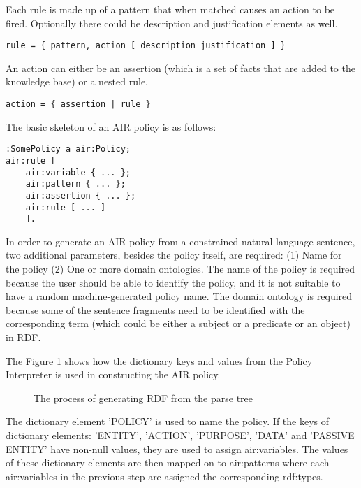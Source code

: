 \documentclass{llncs}
\begin{document}
Each rule is made up of a pattern that when matched causes an action to be fired. Optionally there could be description and justification elements as well.

\begin{verbatim}
rule = { pattern, action [ description justification ] } 
\end{verbatim}

An action can either be an assertion (which is a set of facts that are added to the knowledge base) or a nested rule.

\begin{verbatim}
action = { assertion | rule } 
\end{verbatim}

The basic skeleton of an AIR policy is as follows:

\begin{verbatim}
:SomePolicy a air:Policy;
air:rule [
	air:variable { ... };
	air:pattern { ... };
	air:assertion { ... };
	air:rule [ ... ]
	].
\end{verbatim}
	 		
In order to generate an AIR policy from a constrained natural language sentence, two additional parameters, besides the policy itself, are required: (1) Name for the policy (2) One or more domain ontologies. The name of the policy is required because the user should be able to identify the policy, and it is not suitable to have a random machine-generated policy name. The domain ontology is required because some of the sentence fragments need to be identified with the corresponding term (which could be either a subject or a predicate or an object) in RDF.

The Figure \ref{fig-rdf-gen} shows how the dictionary keys and values from the Policy Interpreter is used in constructing the AIR policy.

\begin{figure}[!h]
  \centerline{}
  \caption{The process of generating RDF from the parse tree}
  \label{fig-rdf-gen}
\end{figure}

The dictionary element 'POLICY' is used to name the policy. If the keys of dictionary elements: 'ENTITY', 'ACTION', 'PURPOSE', 'DATA' and 'PASSIVE ENTITY' have non-null values, they are used to assign air:variables. The values of these dictionary elements are then mapped on to air:patterns where each air:variables in the previous step are assigned the corresponding rdf:types.
\end{document}
